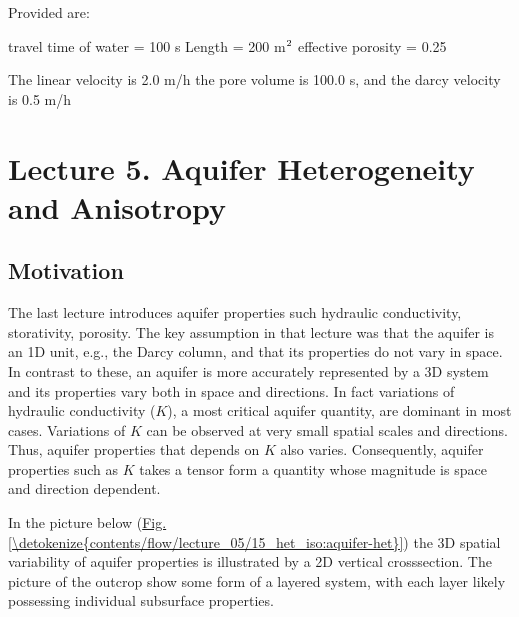 \documentclass[letterpaper,10pt,english]{sphinxmanual}
\begin{document}
\begin{sphinxVerbatim}[commandchars=\\\{\}]
Provided are:

travel time of water = 100 s
Length = 200 m\(\sp{\text{2}}\)
effective porosity = 0.25  

The linear velocity is 2.0 m/h 
the pore volume is 100.0 s, and 
the darcy velocity is 0.5 m/h
\end{sphinxVerbatim}


\section{Lecture 5. Aquifer Heterogeneity and Anisotropy}
\label{\detokenize{contents/flow/lecture_05/15_het_iso:lecture-5-aquifer-heterogeneity-and-anisotropy}}\label{\detokenize{contents/flow/lecture_05/15_het_iso::doc}}


\subsection{Motivation}
\label{\detokenize{contents/flow/lecture_05/15_het_iso:motivation}}
The last lecture introduces aquifer properties such hydraulic conductivity, storativity, porosity. The key assumption in that lecture was that the aquifer is an 1D unit, e.g., the Darcy column, and that its properties do not vary in space. In contrast to these, an aquifer is more accurately represented by a 3D system and its properties vary both in space and directions. In fact variations of hydraulic conductivity (\(K\)), a most critical aquifer quantity, are dominant in most cases. Variations of \(K\) can be observed at very small spatial scales and directions. Thus, aquifer properties that depends on \(K\) also varies. Consequently, aquifer properties such as \(K\) takes a tensor form\sphinxhyphen{} a quantity whose magnitude is space and direction dependent.

In the picture below (\hyperref[\detokenize{contents/flow/lecture_05/15_het_iso:aquifer-het}]{Fig.\@ \ref{\detokenize{contents/flow/lecture_05/15_het_iso:aquifer-het}}}) the 3\sphinxhyphen{}D spatial variability of aquifer properties is illustrated by a 2\sphinxhyphen{}D vertical cross\sphinxhyphen{}section. The picture of the outcrop show some form of a layered system, with each layer likely possessing individual subsurface properties.
\end{document}
